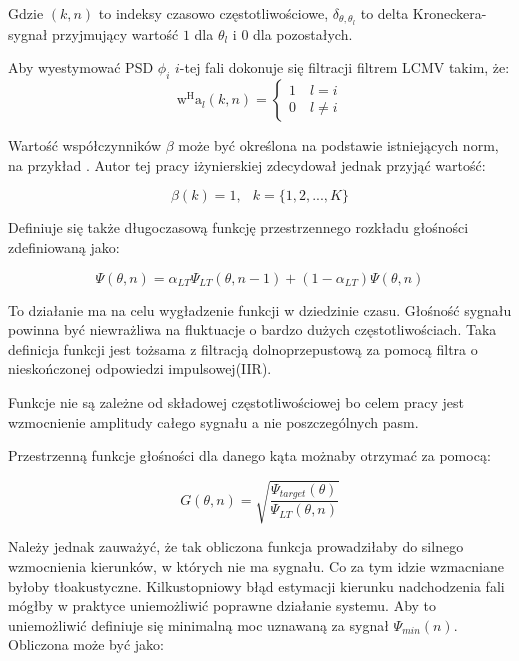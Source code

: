 \noindent Gdzie $(k,n)$ to indeksy czasowo częstotliwościowe, $\delta_{\theta,\theta_{l}}$ to delta Kroneckera- sygnał przyjmujący wartość $1$ dla $\theta_{l}$ i $0$ dla pozostałych.

\noindent Aby wyestymować PSD $\phi_{i}$ $i$-tej fali dokonuje się filtracji filtrem LCMV takim, że:
\begin{equation}
    \label{equation:power estimation}
    \bm{\mathrm{w}}^{\mathrm{H}}\bm{\mathrm{a}}_{l}(k,n)=
    \begin{cases}
        1 \quad l=i \\
        0 \quad l \neq i
    \end{cases}
\end{equation}


\noindent Wartość współczynników $\beta$ może być określona na podstawie istniejących norm, na przykład \cite{coef}. Autor tej pracy iżynierskiej zdecydował jednak przyjąć wartość:

\begin{equation}
    \label{equation:beta}
    \beta(k) = 1, \,\,\,\ k=\{1,2,...,K\}
\end{equation}

\noindent Definiuje się także długoczasową funkcję przestrzennego rozkładu głośności zdefiniowaną jako:

\begin{equation}
    \label{equation:LT_SLD}
    \Psi(\theta,n)=
    \alpha_{LT}\Psi_{LT}(\theta,n-1)
    +(1-\alpha_{LT})\Psi(\theta,n)
\end{equation}

\noindent To działanie ma na celu wygładzenie funkcji w dziedzinie czasu. Głośność sygnału powinna być niewrażliwa na fluktuacje o bardzo dużych częstotliwościach. Taka definicja funkcji jest tożsama z filtracją dolnoprzepustową za pomocą filtra o nieskończonej odpowiedzi impulsowej(IIR).

\noindent Funkcje nie są zależne od składowej częstotliwościowej bo celem pracy jest wzmocnienie amplitudy całego sygnału a nie poszczególnych pasm.

\noindent Przestrzenną funkcje głośności dla danego kąta możnaby otrzymać za pomocą:

\begin{equation}
    \label{equation:sqrt}
    G(\theta,n)=
    \sqrt{\dfrac{\Psi_{target}(\theta)}{
    \Psi_{LT}(\theta,n)}}
\end{equation}

\noindent Należy jednak zauważyć, że tak obliczona funkcja prowadziłaby do silnego wzmocnienia kierunków, w których nie ma sygnału. Co za tym idzie wzmacniane byłoby tłoakustyczne. Kilkustopniowy błąd estymacji kierunku nadchodzenia fali mógłby w praktyce uniemożliwić poprawne działanie systemu. Aby to uniemożliwić definiuje się minimalną moc uznawaną za sygnał $\Psi_{min}(n)$. Obliczona może być jako:

